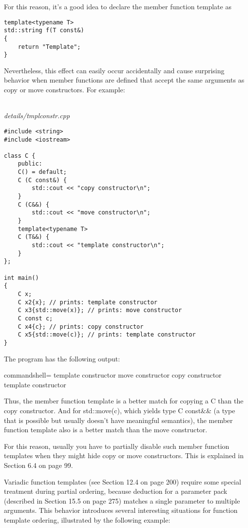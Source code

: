 For this reason, it’s a good idea to declare the member function template as

\begin{lstlisting}[style=styleCXX]
template<typename T>
std::string f(T const&)
{
	return "Template";
}
\end{lstlisting}

Nevertheless, this effect can easily occur accidentally and cause surprising behavior when member functions are defined that accept the same arguments as copy or move constructors. For example:

\hspace*{\fill} \\ %
\noindent
\textit{details/tmplconstr.cpp}
\begin{lstlisting}[style=styleCXX]
#include <string>
#include <iostream>

class C {
	public:
	C() = default;
	C (C const&) {
		std::cout << "copy constructor\n";
	}
	C (C&&) {
		std::cout << "move constructor\n";
	}
	template<typename T>
	C (T&&) {
		std::cout << "template constructor\n";
	}
};

int main()
{
	C x;
	C x2{x}; // prints: template constructor
	C x3{std::move(x)}; // prints: move constructor
	C const c;
	C x4{c}; // prints: copy constructor
	C x5{std::move(c)}; // prints: template constructor
}
\end{lstlisting}

The program has the following output:

\begin{tcblisting}{commandshell={}}
template constructor
move constructor
copy constructor
template constructor
\end{tcblisting}

Thus, the member function template is a better match for copying a C than the copy constructor. And for std::move(c), which yields type C const\&\& (a type that is possible but usually doesn’t have meaningful semantics), the member function template also is a better match than the move constructor.

For this reason, usually you have to partially disable such member function templates when they might hide copy or move constructors. This is explained in Section 6.4 on page 99.



Variadic function templates (see Section 12.4 on page 200) require some special treatment during partial ordering, because deduction for a parameter pack (described in Section 15.5 on page 275) matches a single parameter to multiple arguments. This behavior introduces several interesting situations for function template ordering, illustrated by the following example:

